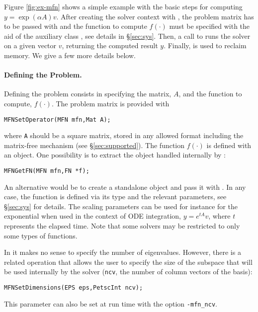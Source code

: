 Figure \ref{fig:ex-mfn} shows a simple example with the basic steps for computing $y=\exp(\alpha A)v$. After creating the solver context with , the problem matrix has to be passed with  and the function to compute $f(\cdot)$ must be specified with the aid of the auxiliary class , see details in \S\ref{sec:sys}. Then, a call to  runs the solver on a given vector $v$, returning the computed result $y$. Finally,  is used to reclaim memory. We give a few more details below.

\paragraph{Defining the Problem.}

Defining the problem consists in specifying the matrix, $A$, and the function to compute, $f(\cdot)$. The problem matrix is provided with
	\begin{Verbatim}[fontsize=\small]
	MFNSetOperator(MFN mfn,Mat A);
	\end{Verbatim}
where \texttt{A} should be a square matrix, stored in any allowed \petsc format including the matrix-free mechanism (see \S\ref{sec:supported}). The function $f(\cdot)$ is defined with an  object. One possibility is to extract the  object handled internally by :
	\begin{Verbatim}[fontsize=\small]
	MFNGetFN(MFN mfn,FN *f);
	\end{Verbatim}
An alternative would be to create a standalone  object and pass it with . In any case, the function is defined via its type and the relevant parameters, see \S\ref{sec:sys} for details. The scaling parameters can be used for instance for the exponential when used in the context of ODE integration, $y=e^{tA}v$, where $t$ represents the elapsed time. Note that some  solvers may be restricted to only some types of  functions.

In  it makes no sense to specify the number of eigenvalues. However, there is a related operation that allows the user to specify the size of the subspace that will be used internally by the solver (\texttt{ncv}, the number of column vectors of the basis):
	\begin{Verbatim}[fontsize=\small]
	MFNSetDimensions(EPS eps,PetscInt ncv);
	\end{Verbatim}
This parameter can also be set at run time with the option \Verb!-mfn_ncv!.


